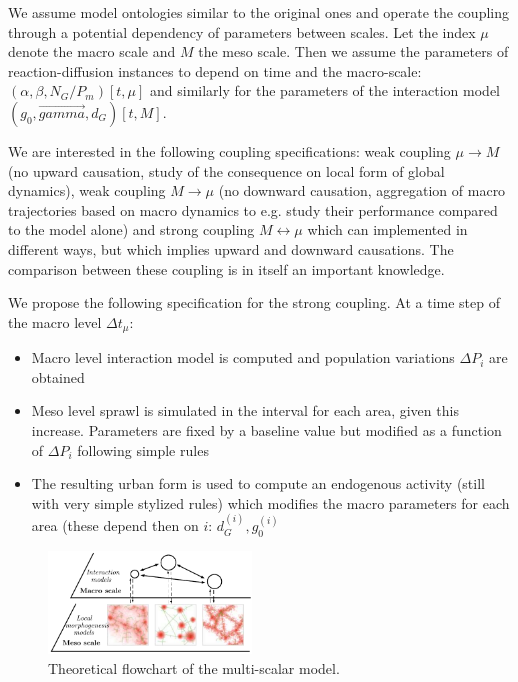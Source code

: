 \documentclass[a4paper,twocolumn,twoside,10pt]{article}
\theoremstyle{definition}
\begin{document}
We assume model ontologies similar to the original ones and operate the coupling through a potential dependency of parameters between scales. Let the index $\mu$ denote the macro scale and $M$ the meso scale. Then we assume the parameters of reaction-diffusion instances to depend on time and the macro-scale: $(\alpha,\beta,N_G/P_m)\left[t,\mu\right]$ and similarly for the parameters of the interaction model $(g_0,\vec{gamma},d_G)\left[t,M\right]$.

We are interested in the following coupling specifications: weak coupling $\mu \rightarrow M$ (no upward causation, study of the consequence on local form of global dynamics), weak coupling $M \rightarrow \mu$ (no downward causation, aggregation of macro trajectories based on macro dynamics to e.g. study their performance compared to the model alone) and strong coupling $M \leftrightarrow \mu$ which can implemented in different ways, but which implies upward and downward causations. The comparison between these coupling is in itself an important knowledge.

We propose the following specification for the strong coupling. At a time step of the macro level $\Delta t_{\mu}$:
\begin{itemize}
	\item Macro level interaction model is computed and population variations $\Delta P_i$ are obtained
	\item Meso level sprawl is simulated in the interval for each area, given this increase. Parameters are fixed by a baseline value but modified as a function of $\Delta P_i$ following simple rules %
	\item The resulting urban form is used to compute an endogenous activity (still with very simple stylized rules) which modifies the macro parameters for each area (these depend then on $i$: $d_G^{(i)},g_0^{(i)}$
\end{itemize}






\begin{figure}[htp]
\centering
\includegraphics[width=0.48\textwidth]{figures/multiscale_morph.pdf}
\caption{Theoretical flowchart of the multi-scalar model.}
\label{fig:model}
\end{figure}
\end{document}

